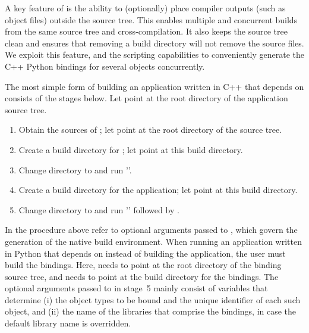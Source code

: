 A key feature of \cmake{} is the ability to (optionally) place compiler outputs (such as object files) outside the source tree. This enables multiple and concurrent builds from the same source tree and cross-compilation. It also keeps the source tree clean and ensures that removing a build directory will not remove the source files.  We exploit this feature, and the scripting capabilities to conveniently generate the C++ Python bindings for several \cgal{} objects concurrently.

The most simple form of building an application written in C++ that depends on \cgal{} consists of the stages below. Let  point at the root directory of the application source tree.
\begin{enumerate}
\item Obtain the sources of \cgal{}; let  point at the root directory of the \cgal{} source tree.
\item Create a build directory for \cgal{}; let  point at this build directory.
\item Change directory to  and run ''.
\item Create a build directory for the application; let  point at this build directory.
\item Change directory to  and run '' followed by .
\end{enumerate}

In the procedure above  refer to optional arguments passed to , which govern the generation of the native build environment. When running an application written in Python that depends on \cgal{} instead of building the application, the user must build the bindings. Here,  needs to point at the root directory of the binding source tree, and  needs to point at the build directory for the bindings. The optional arguments passed to  in stage~5 mainly consist of variables that determine (i) the object types to be bound and the unique identifier of each such object, and (ii) the name of the libraries that comprise the bindings, in case the default library name is overridden.

